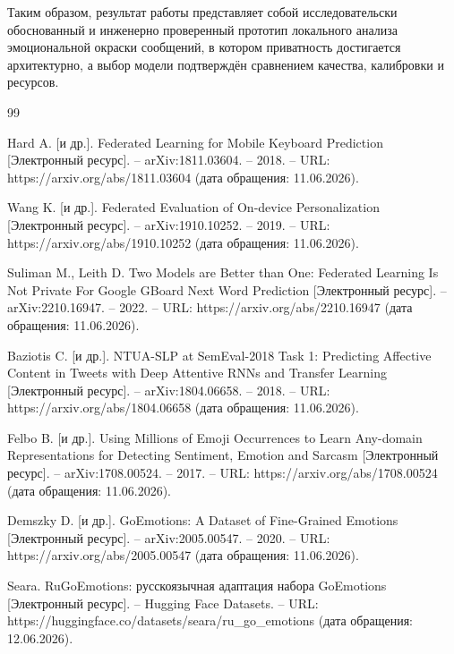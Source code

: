 \documentclass[12pt,a4paper]{report}
\providecommand{\url}[1]{#1}
\renewcommand{\bibname}{Список использованных источников}
\providecommand{\refname}{Список использованных источников}
\renewcommand{\refname}{Список использованных источников}
\renewcommand{\bibname}{Список использованных источников}%
\renewcommand{\refname}{Список использованных источников}%
\begin{document}
Таким образом, результат работы представляет собой исследовательски обоснованный и инженерно проверенный прототип локального анализа эмоциональной окраски сообщений, в котором приватность достигается архитектурно, а выбор модели подтверждён сравнением качества, калибровки и ресурсов.

\renewcommand{\bibname}{Список использованных источников}
\renewcommand{\refname}{Список использованных источников}

\begin{thebibliography}{99}

Hard A. [и др.]. Federated Learning for Mobile Keyboard Prediction [Электронный ресурс]. -- arXiv:1811.03604. -- 2018. -- URL: \url{https://arxiv.org/abs/1811.03604} (дата обращения: 11.06.2026).

Wang K. [и др.]. Federated Evaluation of On-device Personalization [Электронный ресурс]. -- arXiv:1910.10252. -- 2019. -- URL: \url{https://arxiv.org/abs/1910.10252} (дата обращения: 11.06.2026).

Suliman M., Leith D. Two Models are Better than One: Federated Learning Is Not Private For Google GBoard Next Word Prediction [Электронный ресурс]. -- arXiv:2210.16947. -- 2022. -- URL: \url{https://arxiv.org/abs/2210.16947} (дата обращения: 11.06.2026).

Baziotis C. [и др.]. NTUA-SLP at SemEval-2018 Task 1: Predicting Affective Content in Tweets with Deep Attentive RNNs and Transfer Learning [Электронный ресурс]. -- arXiv:1804.06658. -- 2018. -- URL: \url{https://arxiv.org/abs/1804.06658} (дата обращения: 11.06.2026).

Felbo B. [и др.]. Using Millions of Emoji Occurrences to Learn Any-domain Representations for Detecting Sentiment, Emotion and Sarcasm [Электронный ресурс]. -- arXiv:1708.00524. -- 2017. -- URL: \url{https://arxiv.org/abs/1708.00524} (дата обращения: 11.06.2026).

Demszky D. [и др.]. GoEmotions: A Dataset of Fine-Grained Emotions [Электронный ресурс]. -- arXiv:2005.00547. -- 2020. -- URL: \url{https://arxiv.org/abs/2005.00547} (дата обращения: 11.06.2026).

Seara. RuGoEmotions: русскоязычная адаптация набора GoEmotions [Электронный ресурс]. -- Hugging Face Datasets. -- URL: \url{https://huggingface.co/datasets/seara/ru_go_emotions} (дата обращения: 12.06.2026).


\end{thebibliography}
\end{document}
